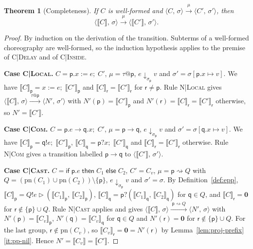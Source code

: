 \documentclass[11pt]{article}
\makeatletter
\theoremstyle{plain}
\newtheorem{theorem}{Theorem}[section]
\theoremstyle{definition}
\theoremstyle{remark}
\newcommand{\kw}[1]{\mathsf{#1}}
\newcommand{\kif}{\kw{if}\;}
\newcommand{\kthen}{\;\kw{then}\;}
\newcommand{\kelse}{\;\kw{else}\;}
\newcommand{\nil}{\mathbf{0}}
\newcommand{\seq}{;\;}
\newcommand{\pp}{\mathsf{p}}
\newcommand{\qq}{\mathsf{q}}
\newcommand{\rr}{\mathsf{r}}
\newcommand{\pn}{\mathrm{pn}}
\newcommand{\eval}[3]{#1 \downarrow_{#2} #3}
\newcommand{\conf}[2]{\langle #1,\, #2\rangle}
\newcommand{\lto}[1]{\xrightarrow{\;#1\;}}
\newcommand{\proj}[2]{\llbracket #1 \rrbracket_{#2}}
\newcommand{\projn}[1]{\llbracket #1 \rrbracket}
\newcommand{\tauat}[1]{\tau\mathord{@}#1}
\newcommand{\cast}[2]{#1 \rightsquigarrow #2}
\newcommand{\upd}[3]{#1[#2 \mapsto #3]}
\newcommand{\rn}[1]{{\normalfont\scshape #1}}
\newcommand{\ifcond}[3]{\kif #1 \kthen #2 \kelse #3}
\newcommand{\sendbr}[4]{#1!#2 \mathbin{\triangleright} (#3,\, #4)}
\newcommand{\recvbr}[3]{#1?(#2,\, #3)}
\newcommand{\case}[1]{\medskip\noindent\textbf{Case #1.}\;}
\makeatother
\begin{document}
\begin{theorem}[Completeness]\label{thm:completeness}
  If $C$ is well-formed and $\conf{C}{\sigma}\lto{\mu}\conf{C'}{\sigma'}$, then
  \[
    \conf{\projn{C}}{\sigma}\lto{\mu}\conf{\projn{C'}}{\sigma'}.
  \]
\end{theorem}
\begin{proof}
  By induction on the derivation of the transition.  Subterms of a
  well-formed choreography are well-formed, so the induction hypothesis
  applies to the premise of \rn{C|Delay} and of \rn{C|Inside}.

  \case{\rn{C|Local}}
  $C = \pp.x := e\seq C'$, $\mu = \tauat\pp$, $\eval{e}{\sigma_\pp}{v}$ and
  $\sigma' = \upd{\sigma}{\pp.x}{v}$.  We have $\proj{C}{\pp} = x := e\seq\proj{C'}{\pp}$
  and $\proj{C}{\rr} = \proj{C'}{\rr}$ for $\rr\neq\pp$.  Rule \rn{N|Local}
  gives $\conf{\projn{C}}{\sigma}\lto{\tauat\pp}\conf{N'}{\sigma'}$ with
  $N'(\pp) = \proj{C'}{\pp}$ and $N'(\rr) = \proj{C}{\rr} = \proj{C'}{\rr}$
  otherwise, so $N' = \projn{C'}$.

  \case{\rn{C|Com}}
  $C = \pp.e\to\qq.x\seq C'$, $\mu = \pp\to\qq$, $\eval{e}{\sigma_\pp}{v}$ and
  $\sigma' = \upd{\sigma}{\qq.x}{v}$.  We have
  $\proj{C}{\pp} = \qq!e\seq\proj{C'}{\pp}$, $\proj{C}{\qq} = \pp?x\seq\proj{C'}{\qq}$
  and $\proj{C}{\rr} = \proj{C'}{\rr}$ otherwise.  Rule \rn{N|Com} gives a
  transition labelled $\pp\to\qq$ to $\conf{\projn{C'}}{\sigma'}$.

  \case{\rn{C|Cast}}
  $C = \ifcond{\pp.e}{C_1}{C_2}$, $C' = C_v$, $\mu = \cast{\pp}{Q}$ with
  $Q = (\pn(C_1)\cup\pn(C_2))\setminus\{\pp\}$, $\eval{e}{\sigma_\pp}{v}$ and
  $\sigma' = \sigma$.  By Definition~\ref{def:epp},
  $\proj{C}{\pp} = \sendbr{Q}{e}{\proj{C_1}{\pp}}{\proj{C_2}{\pp}}$,
  $\proj{C}{\qq} = \recvbr{\pp}{\proj{C_1}{\qq}}{\proj{C_2}{\qq}}$ for $\qq\in Q$,
  and $\proj{C}{\rr} = \nil$ for $\rr\notin\{\pp\}\cup Q$.  Rule \rn{N|Cast}
  applies and gives $\conf{\projn{C}}{\sigma}\lto{\cast{\pp}{Q}}\conf{N'}{\sigma}$
  with $N'(\pp) = \proj{C_v}{\pp}$, $N'(\qq) = \proj{C_v}{\qq}$ for $\qq\in Q$
  and $N'(\rr) = \nil$ for $\rr\notin\{\pp\}\cup Q$.  For the last group,
  $\rr\notin\pn(C_v)$, so $\proj{C_v}{\rr} = \nil = N'(\rr)$ by
  Lemma~\ref{lem:proj-prefix}\ref{it:pp-nil}.  Hence $N' = \projn{C_v} = \projn{C'}$.


\end{proof}
\end{document}
